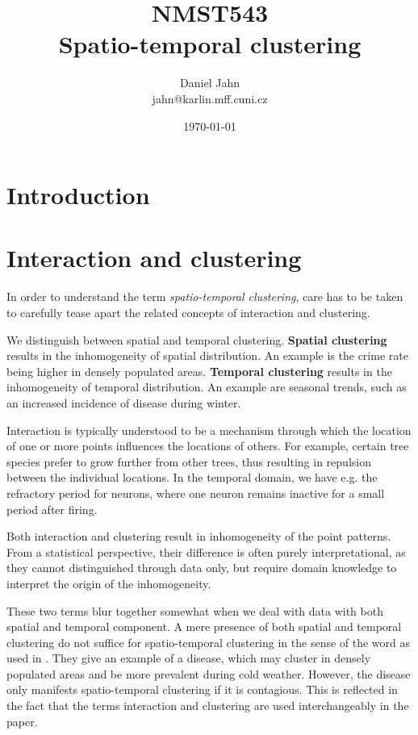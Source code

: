 \documentclass{article}
\begin{document}
\title{NMST543 \\
Spatio-temporal clustering}
\author{Daniel Jahn \\
jahn@karlin.mff.cuni.cz}  
\date{\today} 
\maketitle


\section{Introduction}

\section{Interaction and clustering}
In order to understand the term \textit{spatio-temporal clustering}, care has to be taken to carefully tease apart the related concepts of interaction and clustering.

We distinguish between spatial and temporal clustering. \textbf{Spatial clustering} results in the inhomogeneity of spatial distribution. An example is the crime rate being higher in densely populated areas. 
\textbf{Temporal clustering} results in the inhomogeneity of temporal distribution. An example are seasonal trends, such as an increased incidence of disease during winter. 
 
Interaction is typically understood to be a mechanism through which the location of one or more points influences the locations of others. For example, certain tree species prefer to grow further from other trees, thus resulting in repulsion between the individual locations. In the temporal domain, we have e.g. the refractory period for neurons, where one neuron remains inactive for a small period after firing. 

Both interaction and clustering result in inhomogeneity of the point patterns. From a statistical perspective, their difference is often purely interpretational, as they cannot distinguished through data only, but require domain knowledge to interpret the origin of the inhomogeneity. 

These two terms blur together somewhat when we deal with data with both spatial and temporal component. A mere presence of both spatial and temporal clustering do not suffice for spatio-temporal clustering in the sense of the word as used in \cite{diggle1995}. They give an example of a disease, which may cluster in densely populated areas and be more prevalent during cold weather. However, the disease only manifests spatio-temporal clustering if it is contagious.
This is reflected in the fact that the terms interaction and clustering are used interchangeably in the paper.
\end{document}
